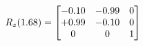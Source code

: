 \documentclass[preview]{standalone}
\begin{document}
\begin{align*}
\special{dvisvgm:raw <g id='unique000'>}R_{z}(1.68) = \begin{bmatrix}-0.10 & -0.99 & 0 \\+0.99 & -0.10 & 0 \\0 & 0 & 1\end{bmatrix}\special{dvisvgm:raw </g>}
\end{align*}
\end{document}
